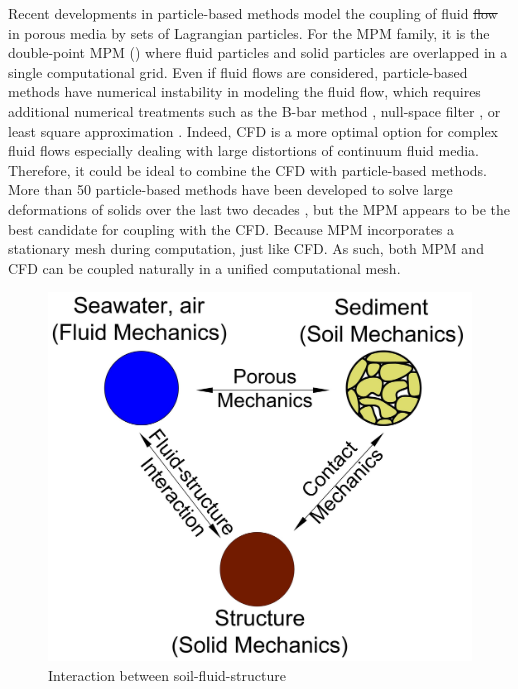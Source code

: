 \documentclass[preprint,12pt]{elsarticle}
\providecommand{\DIFadd}[1]{{\protect\color{blue}\uwave{#1}}} %
\providecommand{\DIFdel}[1]{{\protect\color{red}\sout{#1}}}                      %
\providecommand{\DIFaddbegin}{} %
\providecommand{\DIFaddend}{} %
\providecommand{\DIFdelbegin}{} %
\providecommand{\DIFdelend}{} %
\newcommand{\DIFscaledelfig}{0.5}
\newlength{\DIFdelgraphicswidth} %
\newlength{\DIFdelgraphicsheight} %
\newcommand{\DIFaddincludegraphics}[2][]{{\color{blue}\fbox{\DIFOincludegraphics[#1]{#2}}}} %
\newcommand{\DIFdelincludegraphics}[2][]{%
\sbox{\DIFdelgraphicsbox}{\DIFOincludegraphics[#1]{#2}}%
\settoboxwidth{\DIFdelgraphicswidth}{\DIFdelgraphicsbox} %
\settoboxtotalheight{\DIFdelgraphicsheight}{\DIFdelgraphicsbox} %
\scalebox{\DIFscaledelfig}{%
\parbox[b]{\DIFdelgraphicswidth}{\usebox{\DIFdelgraphicsbox}\\[-\baselineskip] \rule{\DIFdelgraphicswidth}{0em}}\llap{\resizebox{\DIFdelgraphicswidth}{\DIFdelgraphicsheight}{%
\setlength{\unitlength}{\DIFdelgraphicswidth}%
\begin{picture}(1,1)%
\thicklines\linethickness{2pt} %
{\color[rgb]{1,0,0}\put(0,0){\framebox(1,1){}}}%
{\color[rgb]{1,0,0}\put(0,0){\line( 1,1){1}}}%
{\color[rgb]{1,0,0}\put(0,1){\line(1,-1){1}}}%
\end{picture}%
}\hspace*{3pt}}} %
} %
\DeclareRobustCommand{\DIFaddbegin}{\DIFOaddbegin \let\includegraphics\DIFaddincludegraphics} %
\DeclareRobustCommand{\DIFaddend}{\DIFOaddend \let\includegraphics\DIFOincludegraphics} %
\DeclareRobustCommand{\DIFdelbegin}{\DIFOdelbegin \let\includegraphics\DIFdelincludegraphics} %
\DeclareRobustCommand{\DIFdelend}{\DIFOaddend \let\includegraphics\DIFOincludegraphics} %
\begin{document}
Recent developments in particle-based methods model the coupling of fluid \DIFdelbegin \DIFdel{flow }\DIFdelend \DIFaddbegin \DIFadd{flows }\DIFaddend in porous media by sets of Lagrangian particles. For the MPM family, it is the double-point MPM (\cite{Bandara2015, Tampubolon2017, Baumgarten2019}) where fluid particles and solid particles are overlapped in a single computational grid. Even if fluid flows are considered, particle-based methods have numerical instability in modeling the fluid flow, which requires additional numerical treatments such as the B-bar method \cite{Bandara2015}, null-space filter \cite{nullspace}, or least square approximation \cite{Zheng2021, CPLS}. Indeed, CFD is a more optimal option for complex fluid flows especially dealing with large distortions of continuum fluid media. Therefore, it could be ideal to combine the CFD with particle-based methods. More than 50 particle-based methods have been developed to solve large deformations of solids over the last two decades \cite{Chen2017}, but the MPM appears to be the best candidate for coupling with the CFD. Because MPM incorporates a stationary mesh during computation, just like CFD. As such, both MPM and CFD can be coupled naturally in a unified computational mesh.\\
%
%
\begin{figure}[h]
\center
\includegraphics[scale=.3]{3phases.jpg}
\caption{Interaction between soil-fluid-structure}
\label{fig:3phases}
\end {figure}
%
%
\end{document}
